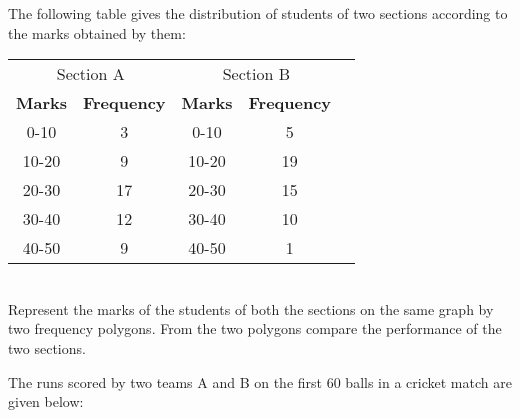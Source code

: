 \item 

\solution


\item 

\solution


  \item 

\solution


\item 

\solution

\item 

\solution

\item

\solution


\item The following table gives the distribution of students of two sections according to
the marks obtained by them:\\

\begin{tabular}{|c|c|c|c|c|}
\hline
 \multicolumn{2}{c|}{Section A}  
    &\multicolumn{2}{c|}{Section B} \\
\cline{2-4}

 \textbf{Marks} &\textbf{Frequency} &\textbf{Marks} &\textbf{Frequency} \\
\hline
0-10 &3 &0-10 &5\\
10-20 &9 &10-20 &19\\
20-30 &17 &20-30 &15\\
30-40 &12 &30-40 &10\\
40-50 &9 &40-50 &1\\
\hline

\end{tabular}\\

Represent the marks of the students of both the sections on the same graph by two frequency polygons. From the two polygons compare the performance of the two sections.\\
\item The runs scored by two teams A and B on the first 60 balls in a cricket match are given below:\\

